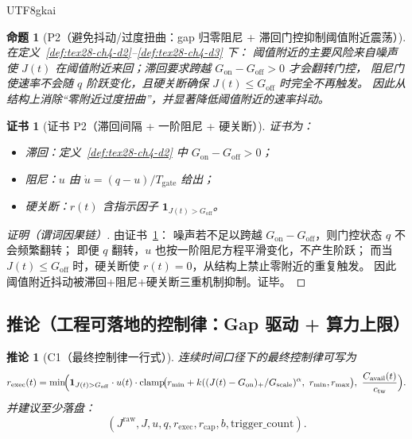 \documentclass[12pt]{article}
\newtheorem{proposition}{命题}[section]
\newtheorem{corollary}{推论}[section]
\newtheorem{Certificate}{证书}[section]
\newcommand{\indicator}[1]{\mathbf{1}_{#1}}
\newcommand{\clamp}{\operatorname{clamp}}
\begin{document}
\begin{CJK*}{UTF8}{gkai}
\begin{proposition}[P2（避免抖动/过度扭曲：gap 归零阻尼 + 滞回门控抑制阈值附近震荡）]
\label{prop:tex28-ch4-p2}
在定义~\ref{def:tex28-ch4-d2}--\ref{def:tex28-ch4-d3} 下：
阈值附近的主要风险来自噪声使 $J(t)$ 在阈值附近来回；滞回要求跨越 $G_{\mathrm{on}}-G_{\mathrm{off}}>0$ 才会翻转门控，
阻尼门使速率不会随 $q$ 阶跃变化，且硬关断确保 $J(t)\le G_{\mathrm{off}}$ 时完全不再触发。
因此从结构上消除“零附近过度扭曲”，并显著降低阈值附近的速率抖动。
\end{proposition}

\begin{Certificate}[证书 P2（滞回间隔 + 一阶阻尼 + 硬关断）]
\label{cert:tex28-ch4-p2}
证书为：
\begin{itemize}
  \item 滞回：定义~\ref{def:tex28-ch4-d2} 中 $G_{\mathrm{on}}-G_{\mathrm{off}}>0$；
  \item 阻尼：$u$ 由 $\dot u=(q-u)/T_{\mathrm{gate}}$ 给出；
  \item 硬关断：$r(t)$ 含指示因子 $\indicator{J(t)>G_{\mathrm{off}}}$。
\end{itemize}
\end{Certificate}

\begin{proof}[证明（谓词因果链）]
由证书~\ref{cert:tex28-ch4-p2}：
噪声若不足以跨越 $G_{\mathrm{on}}-G_{\mathrm{off}}$，则门控状态 $q$ 不会频繁翻转；
即便 $q$ 翻转，$u$ 也按一阶阻尼方程平滑变化，不产生阶跃；
而当 $J(t)\le G_{\mathrm{off}}$ 时，硬关断使 $r(t)=0$，从结构上禁止零附近的重复触发。
因此阈值附近抖动被滞回+阻尼+硬关断三重机制抑制。证毕。
\end{proof}

\subsection{推论（工程可落地的控制律：Gap 驱动 + 算力上限）}
\label{subsec:tex28-ch4-corollaries}

\begin{corollary}[C1（最终控制律一行式）]
\label{cor:tex28-ch4-c1}
连续时间口径下的最终控制律可写为
\[
  r_{\mathrm{exec}}(t)=\min\!\Bigl(
  \indicator{J(t)>G_{\mathrm{off}}}\cdot u(t)\cdot
  \clamp\!\bigl(r_{\min}+k((J(t)-G_{\mathrm{on}})_{+}/G_{\mathrm{scale}})^{\alpha},\ r_{\min},r_{\max}\bigr),
  \ \frac{C_{\mathrm{avail}}(t)}{c_{\mathrm{tw}}}
  \Bigr).
\]
并建议至少落盘：
\[
  (J^{\mathrm{raw}},J,u,q,r_{\mathrm{exec}},r_{\mathrm{cap}},b,\mathrm{trigger\_count}).
\]
\end{corollary}


\end{CJK*}
\end{document}
